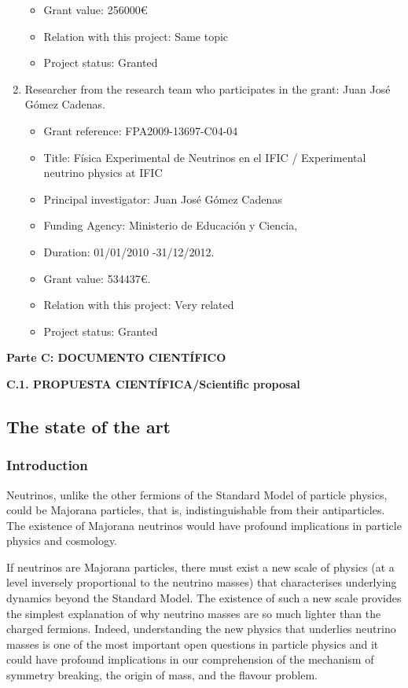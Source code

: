 \documentclass[a4paper,11pt,oneside]{article}
\begin{document}
\begin{enumerate}
\begin{itemize}
  \item[] Grant value: 256000\euro
  \item[] Relation with this project: Same topic
  \item[] Project status: Granted
  \end{itemize}
\item Researcher from the research team who participates in the grant: Juan Jos\'e G\'omez Cadenas.
  \begin{itemize}
  \item[] Grant reference: FPA2009-13697-C04-04 
  \item[] Title:  Física Experimental de Neutrinos en el IFIC / Experimental neutrino physics at IFIC 
  \item[] Principal investigator: Juan Jos\'e G\'omez Cadenas
  \item[] Funding Agency:  Ministerio de Educaci\'on y Ciencia, 
  \item[] Duration: 01/01/2010 -31/12/2012.
  \item[] Grant value: 534437\euro. 
  \item[] Relation with this project: Very related
  \item[] Project status: Granted
  \end{itemize}
\end{enumerate}

\newpage
\setcounter{page}{1}

\begin{tcolorbox}[colback=yellow,arc=0pt,outer arc=0pt,colframe=black,boxrule=0.6pt,left=0mm]
  \textbf{Parte C: DOCUMENTO CIENT\'IFICO}
\end{tcolorbox}

\noindent\textbf{C.1. PROPUESTA CIENT\'IFICA/Scientific proposal}
\subsection*{The state of the art}
\subsubsection*{Introduction}
Neutrinos, unlike the other fermions of the Standard Model of particle physics, could be Majorana particles, that is, indistinguishable from their antiparticles. The existence of Majorana neutrinos would have profound implications in particle physics and cosmology. 

If neutrinos are Majorana particles, there must exist a new scale of physics (at a level inversely proportional to the neutrino masses) that characterises underlying dynamics beyond the Standard Model. The existence of such a new scale provides the simplest explanation of why neutrino masses are so much lighter than the charged fermions. Indeed,  understanding the new physics that underlies neutrino masses is one of the most important open questions in particle physics and it could have profound implications in our comprehension of the mechanism of symmetry breaking, the origin of mass, and the flavour problem. 
\end{document}
